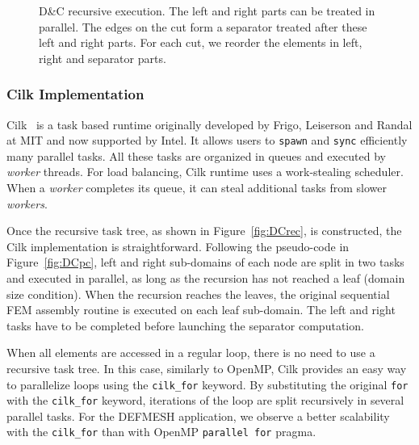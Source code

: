 \documentclass[10pt]{IOS-Book-Article}
\begin{document}
\begin{figure}[htp]
\caption{D\&C recursive execution. The left and right parts can be treated in parallel.
The edges on the cut form a separator treated after these left and right parts.
For each cut, we reorder the elements in left, right and separator parts.}
\end{figure}

\subsubsection{Cilk Implementation}
Cilk~\cite{cilk5} is a task based runtime originally developed by Frigo, Leiserson and Randal at MIT and now supported by Intel.
It allows users to {\tt spawn} and {\tt sync} efficiently many parallel tasks.
All these tasks are organized in queues and executed by \emph{worker} threads.
For load balancing, Cilk runtime uses a work-stealing scheduler.
When a \emph{worker} completes its queue, it can steal additional tasks from slower \emph{workers}.

Once the recursive task tree, as shown in Figure~\ref{fig:DCrec}, is constructed, the Cilk implementation is straightforward.
Following the pseudo-code in Figure~\ref{fig:DCpc}, left and right sub-domains of each node are split in two tasks and executed in parallel, as long as the recursion has not reached a leaf (domain size condition).
When the recursion reaches the leaves, the original sequential FEM assembly routine is executed on each leaf sub-domain.
The left and right tasks have to be completed before launching the separator computation. 


When all elements are accessed in a regular loop, there is no need to use a recursive task tree.
In this case, similarly to OpenMP, Cilk provides an easy way to parallelize loops using the { \tt cilk\_for} keyword.
By substituting the original {\tt for} with the {\tt cilk\_for} keyword, iterations of the loop are split recursively in several parallel tasks.
For the DEFMESH application, we observe a better scalability with the {\tt cilk\_for} than with OpenMP {\tt parallel for} pragma.
\end{document}
